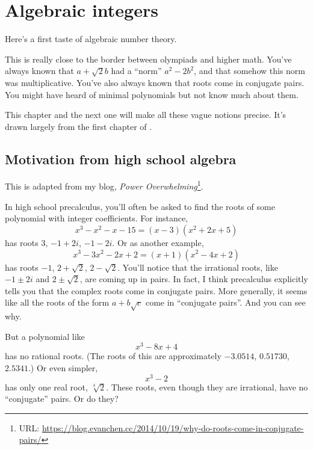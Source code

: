 \chapter{Algebraic integers}
\label{ch:algebraic_integers}
Here's a first taste of algebraic number theory.

This is really close to the border between olympiads and higher math.
You've always known that $a+\sqrt2 b$ had a ``norm'' $a^2-2b^2$,
and that somehow this norm was multiplicative.
You've also always known that roots come in conjugate pairs.
You might have heard of minimal polynomials but not know much about them.

This chapter and the next one will make all these vague notions precise.
It's drawn largely from the first chapter of \cite{ref:oggier_NT}.

\section{Motivation from high school algebra}
This is adapted from my blog, \emph{Power Overwhelming}\footnote{URL:
\url{https://blog.evanchen.cc/2014/10/19/why-do-roots-come-in-conjugate-pairs/}}.

In high school precalculus, you'll often be asked to find the roots of some polynomial with integer coefficients.
For instance,
\[ x^3 - x^2 - x - 15 = (x-3)(x^2+2x+5) \]
has roots $3$, $-1+2i$, $-1-2i$.
Or as another example,
\[ x^3 - 3x^2 - 2x + 2 = (x+1)(x^2-4x+2) \]
has roots $-1$, $2 + \sqrt 2$, $2 - \sqrt 2$.
You'll notice that the irrational roots, like $-1 \pm 2i$ and $2 \pm \sqrt 2$, are coming up in pairs. In fact, I think precalculus explicitly tells you that the complex roots come in conjugate pairs. More generally, it seems like all the roots of the form $a + b \sqrt c$ come in ``conjugate pairs''. And you can see why.

But a polynomial like
\[ x^3 - 8x + 4 \]
has no rational roots.
(The roots of this are approximately $-3.0514$, $0.51730$, $2.5341$.)
Or even simpler,
\[ x^3 - 2 \]
has only one real root, $\sqrt[3]{2}$.
These roots, even though they are irrational, have no ``conjugate'' pairs.
Or do they?

